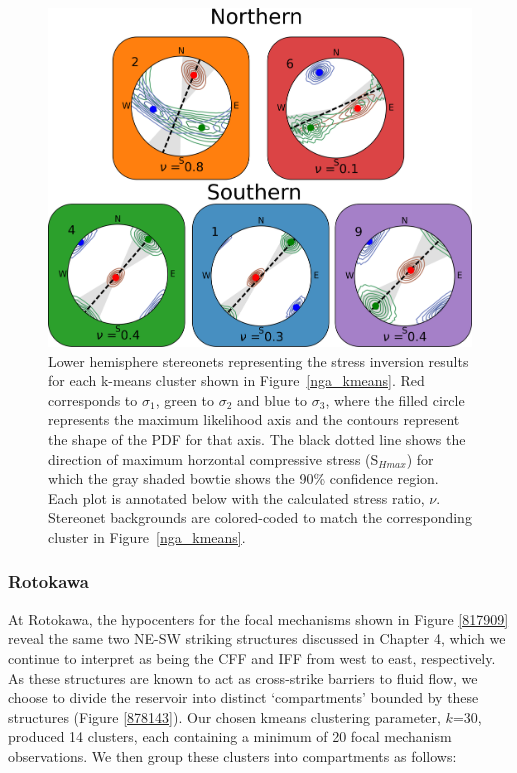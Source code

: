 \begin{figure}[h!]
\begin{center}
\includegraphics[width=0.98\columnwidth]{Chapter_5_FMs/figures/Nga_kmeans_inversion_10/Nga_temps_GC_dets_kmeans_10_transparent_colored}
\caption[Ngatamariki stress inversions from kmeans clusters]{{
Lower hemisphere stereonets representing the stress inversion results for each k-means cluster shown in Figure~{\ref{nga_kmeans}}. Red corresponds to $\sigma_{1}$, green to $\sigma_{2}$ and blue to $\sigma_{3}$, where the filled circle represents the maximum likelihood axis and the contours represent the shape of the PDF for that axis. The black dotted line shows the direction of maximum horzontal compressive stress (S$_{Hmax}$) for which the gray shaded bowtie shows the 90\% confidence region. Each plot is annotated below with the calculated stress ratio, $\nu$. Stereonet backgrounds are colored-coded to match the corresponding cluster in Figure~{\ref{nga_kmeans}}.
{\label{838980}}%
}}
\end{center}
\end{figure}

\subsubsection{Rotokawa}
At Rotokawa, the hypocenters for the focal mechanisms shown in Figure \ref{817909} reveal the same two NE-SW striking structures discussed in Chapter 4, which we continue to interpret as being the \acrfull{CFF} and \acrfull{IFF} from west to east, respectively. As these structures are known to act as cross-strike barriers to fluid flow, we choose to divide the reservoir into distinct `compartments' bounded by these structures (Figure \ref{878143}). Our chosen kmeans clustering parameter, $k$=30, produced 14 clusters, each containing a minimum of 20 focal mechanism observations. We then group these clusters into compartments as follows:

